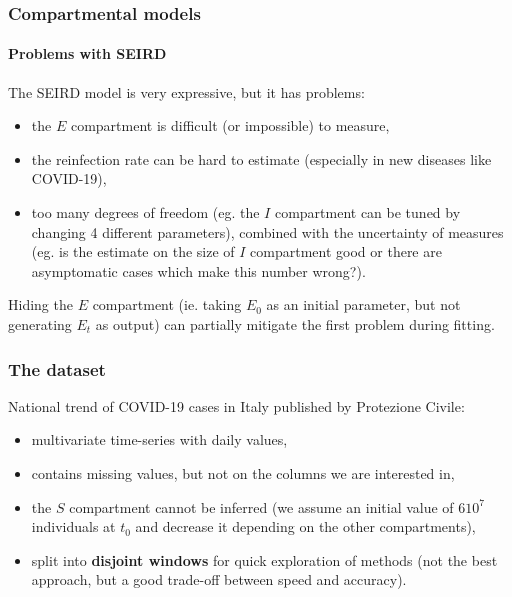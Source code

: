 \documentclass[aspectratio=43]{beamer}
\begin{document}
\begin{frame}
	\frametitle{Compartmental models}
	\framesubtitle{Problems with SEIRD}
	The SEIRD model is very expressive, but it has problems:
	\begin{itemize}
		\item the $E$ compartment is difficult (or impossible) to measure,
		\item the reinfection rate can be hard to estimate (especially in new diseases like COVID-19),
		\item too many degrees of freedom (eg. the $I$ compartment can be tuned by changing 4 different parameters), combined with the uncertainty of measures (eg. is the estimate on the size of $I$ compartment good or there are asymptomatic cases which make this number wrong?).
	\end{itemize}

	Hiding the $E$ compartment (ie. taking $E_0$ as an initial parameter, but not generating $E_t$ as output) can partially mitigate the first problem during fitting.
\end{frame}

\begin{frame}
	\frametitle{The dataset}
	National trend of COVID-19 cases in Italy published by Protezione Civile:
	\begin{itemize}
		\item multivariate time-series with daily values,
		\item contains missing values, but not on the columns we are interested in,
		\item the $S$ compartment cannot be inferred (we assume an initial value of $6 10^7$ individuals at $t_0$ and decrease it depending on the other compartments),
		\item split into \textbf{disjoint windows} for quick exploration of methods (not the best approach, but a good trade-off between speed and accuracy).
	\end{itemize}
	
\end{frame}
\end{document}

